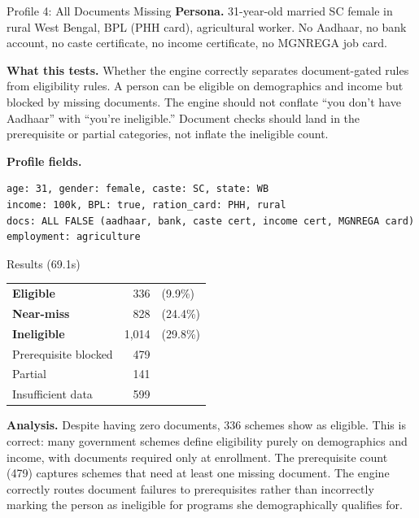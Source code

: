 \documentclass[11pt,a4paper]{article}
\begin{document}
\begin{profilebox}{Profile 4: All Documents Missing}
\textbf{Persona.} 31-year-old married SC female in rural West Bengal, BPL (PHH card), agricultural worker. No Aadhaar, no bank account, no caste certificate, no income certificate, no MGNREGA job card.

\textbf{What this tests.} Whether the engine correctly separates document-gated rules from eligibility rules. A person can be eligible on demographics and income but blocked by missing documents. The engine should not conflate ``you don't have Aadhaar'' with ``you're ineligible.'' Document checks should land in the prerequisite or partial categories, not inflate the ineligible count.

\textbf{Profile fields.}
\begin{lstlisting}
age: 31, gender: female, caste: SC, state: WB
income: 100k, BPL: true, ration_card: PHH, rural
docs: ALL FALSE (aadhaar, bank, caste cert, income cert, MGNREGA card)
employment: agriculture
\end{lstlisting}

\begin{resultbox}{Results (69.1s)}
\begin{tabular}{@{}lrl@{}}
  \textcolor{eligible}{\textbf{Eligible}} & 336 & (9.9\%) \\
  \textcolor{nearmiss}{\textbf{Near-miss}} & 828 & (24.4\%) \\
  \textcolor{inelig}{\textbf{Ineligible}} & 1{,}014 & (29.8\%) \\
  Prerequisite blocked & 479 & \\
  Partial & 141 & \\
  Insufficient data & 599 & \\
\end{tabular}
\end{resultbox}

\textbf{Analysis.} Despite having zero documents, 336 schemes show as eligible. This is correct: many government schemes define eligibility purely on demographics and income, with documents required only at enrollment. The prerequisite count (479) captures schemes that need at least one missing document. The engine correctly routes document failures to prerequisites rather than incorrectly marking the person as ineligible for programs she demographically qualifies for.
\end{profilebox}
\end{document}
